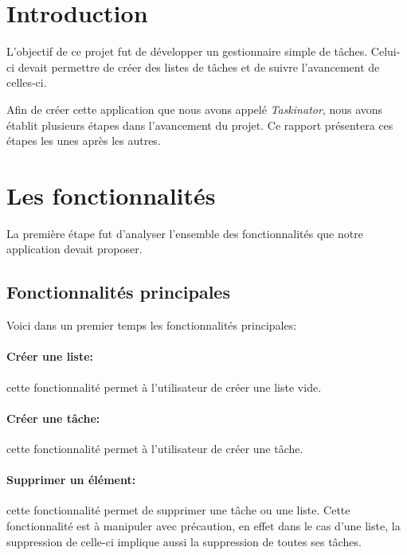 \documentclass[a4paper,10pt]{article}
\begin{document}
\newpage
\pagestyle{fancy}

\section{Introduction}
L'objectif de ce projet fut de développer un gestionnaire simple de tâches. Celui-ci devait permettre de créer des listes de tâches et de suivre l'avancement de celles-ci.

Afin de créer cette application que nous avons appelé \textit{Taskinator}, nous avons établit plusieurs étapes dans l'avancement du projet. Ce rapport présentera ces étapes les unes après les autres.

\newpage
\section{Les fonctionnalités}
La première étape fut d'analyser l'ensemble des fonctionnalités que notre application devait proposer. 

\subsection{Fonctionnalités principales}
Voici dans un premier temps les fonctionnalités principales:
\paragraph{Créer une liste:} cette fonctionnalité permet à l'utilisateur de créer une liste vide.
\paragraph{Créer une tâche:} cette fonctionnalité permet à l'utilisateur de créer une tâche.
\paragraph{Supprimer un élément:} cette fonctionnalité permet de supprimer une tâche ou une liste. Cette fonctionnalité est à manipuler avec
précaution, en effet dans le cas d'une liste, la suppression de celle-ci implique aussi la suppression de toutes ses tâches.
\end{document}
